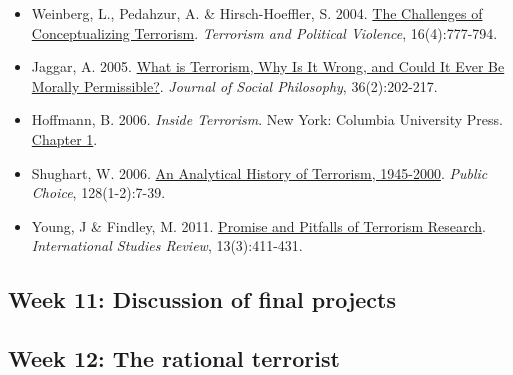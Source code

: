 \documentclass[12pt,]{article}
\providecommand{\tightlist}{%
  \setlength{\itemsep}{0pt}\setlength{\parskip}{0pt}}
\begin{document}
\begin{itemize}
\tightlist
\item
  Weinberg, L., Pedahzur, A. \& Hirsch-Hoeffler, S. 2004.
  \href{https://www.tandfonline.com/doi/pdf/10.1080/095465590899768}{The
  Challenges of Conceptualizing Terrorism}. \emph{Terrorism and
  Political Violence}, 16(4):777-794.
\item
  Jaggar, A. 2005.
  \href{http://onlinelibrary.wiley.com/doi/10.1111/j.1467-9833.2005.00267.x/full}{What
  is Terrorism, Why Is It Wrong, and Could It Ever Be Morally
  Permissible?}. \emph{Journal of Social Philosophy}, 36(2):202-217.
\item
  Hoffmann, B. 2006. \emph{Inside Terrorism}. New York: Columbia
  University Press.
  \href{https://github.com/danilofreire/pols1824w/raw/master/readings/hoffman2006chap1.pdf}{Chapter
  1}.
\item
  Shughart, W. 2006.
  \href{https://link.springer.com/article/10.1007/s11127-006-9043-y}{An
  Analytical History of Terrorism, 1945-2000}. \emph{Public Choice},
  128(1-2):7-39.
\item
  Young, J \& Findley, M. 2011.
  \href{https://doi.org/10.1111/j.1468-2486.2011.01015.x}{Promise and
  Pitfalls of Terrorism Research}. \emph{International Studies Review},
  13(3):411-431.
\end{itemize}

\hypertarget{week-11-discussion-of-final-projects}{%
\subsection{Week 11: Discussion of final
projects}\label{week-11-discussion-of-final-projects}}

\hypertarget{week-12-the-rational-terrorist}{%
\subsection{Week 12: The rational
terrorist}\label{week-12-the-rational-terrorist}}
\end{document}
